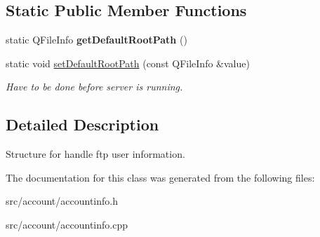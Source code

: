 \subsection*{Static Public Member Functions}
\begin{DoxyCompactItemize}
\item 
\mbox{\label{classAccountInfo_aa3c9fcca47dc666090d8a316b2fe72d2}} 
static Q\+File\+Info {\bfseries get\+Default\+Root\+Path} ()
\item 
\mbox{\label{classAccountInfo_a3a88b32d15964447cedf68513c0ec006}} 
static void \hyperlink{classAccountInfo_a3a88b32d15964447cedf68513c0ec006}{set\+Default\+Root\+Path} (const Q\+File\+Info \&value)
\begin{DoxyCompactList}\small\item\em Have to be done before server is running. \end{DoxyCompactList}\end{DoxyCompactItemize}


\subsection{Detailed Description}
Structure for handle ftp user information. 

The documentation for this class was generated from the following files\+:\begin{DoxyCompactItemize}
\item 
src/account/accountinfo.\+h\item 
src/account/accountinfo.\+cpp\end{DoxyCompactItemize}
